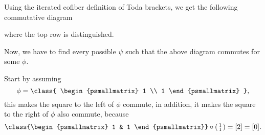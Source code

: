 \begin{example}
	Using the iterated cofiber definition of Toda brackets, we get the following commutative diagram
	\begin{center}
	\end{center}
	where the top row is distinguished.

	Now, we have to find every possible \( \psi \) such that the above diagram commutes for some \( \phi \).

	Start by assuming
	\[ 
		\phi = \class{
			\begin{psmallmatrix}
				1 \\
				1
			\end{psmallmatrix}
		},
	\]
	this makes the square to the left of \( \phi \) commute, in addition, it makes the square to the right of \( \phi \) also commute, because
	\[
		\class{\begin{psmallmatrix} 1 & 1 \end{psmallmatrix}} \circ
		\begin{psmallmatrix}
			1 \\
			1
		\end{psmallmatrix}
		=
		[2] = [0].
	\]


\end{example}
